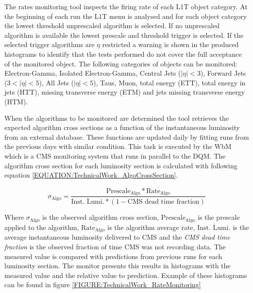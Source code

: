 
The rates monitoring tool inspects the firing rate of each \gls{L1T} object category. At the beginning of each run the \gls{L1T} menu is analysed and for each object category the lowest threshold unprescaled algorithm is selected. If no unprescaled algorithm is available the lowest prescale and threshold trigger is selected. If the selected trigger algorithms are $\eta$ restricted a warning is shown in the produced histograms to identify that the tests performed do not cover the full acceptance of the monitored object. The following categories of objects can be monitored: Electron-Gamma, Isolated Electron-Gamma, Central Jets ($|\eta|<3$), Forward Jets ($3<|\eta|<5$), All Jets ($|\eta|<5$), Taus, Muon, total energy (ETT), total energy in jets (HTT), missing transverse energy (ETM) and jets missing transverse energy (HTM).

When the algorithms to be monitored are determined the tool retrieves the expected algorithm cross sections as a function of the instantaneous luminosity from an external database. These functions are updated daily by fitting runs from the previous days with similar condition. This task is executed by the \gls{WbM} which is a \gls{CMS} monitoring system that runs in parallel to the \gls{DQM}. The algorithm cross section for each luminosity section is calculated with following equation \ref{EQUATION:TechnicalWork_AlgoCrossSection}.

\begin{equation}
\sigma_{\text{Algo}}=\frac{\text{Prescale}_{\text{Algo}}*{\overline{\text{Rate}_{\text{Algo}}}}}{\overline{\text{Inst. Lumi.}}*(1-\text{CMS dead time fraction})}
\label{EQUATION:TechnicalWork_AlgoCrossSection}
\end{equation}

Where $\sigma_{\text{Algo}}$ is the observed algorithm cross section, $\text{Prescale}_{\text{Algo}}$ is the prescale applied to the algorithm, $\overline{\text{Rate}_{\text{Algo}}}$ is the algorithm average rate, $\overline{\text{Inst. Lumi.}}$ is the average instantaneous luminosity delivered to \gls{CMS} and the \textit{CMS dead time fraction} is the observed fraction of time \gls{CMS} was not recording data. The measured value is compared with predictions from previous runs for each luminosity section. The monitor presents this results in histograms with the measured value and the relative value to prediction. Example of these histograms can be found in figure \ref{FIGURE:TechnicalWork_RateMonitoring}

